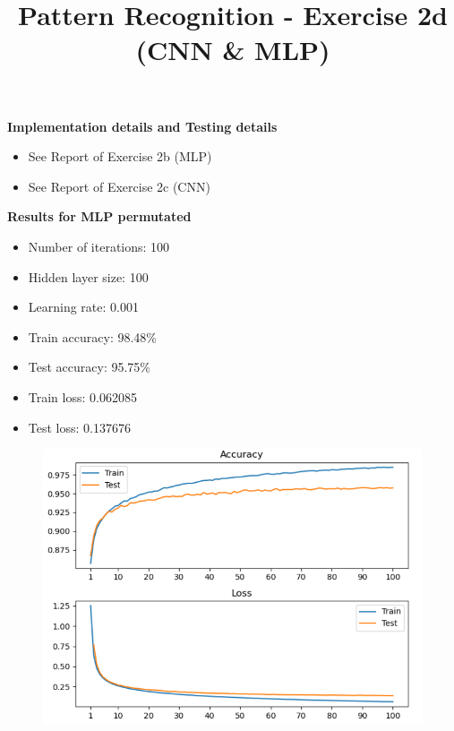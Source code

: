 \documentclass[10pt,a4paper,fullpage]{article}
\begin{document}
\title{Pattern Recognition - Exercise 2d (CNN \& MLP)}
\author{}
\predate{}
\postdate{}
\date{\vspace{-5ex}}
\maketitle


\textbf{Implementation details and Testing details}
\begin{itemize}
	\item See Report of Exercise 2b (MLP)
	\item See Report of Exercise 2c (CNN)
\end{itemize}
\hfill \break

\textbf{Results for MLP permutated}
\begin{itemize}
	\item Number of iterations: 100
    \item Hidden layer size: 100
    \item Learning rate: 0.001
    \item Train accuracy: 98.48\%
    \item Test accuracy: 95.75\%
    \item Train loss: 0.062085
    \item Test loss: 0.137676
\end{itemize}

\begin{figure}[H]
	\begin{center}
		\includegraphics[scale=0.6]{mlp_model_plot_permutated.png}
	\end{center}
\end{figure}
\end{document}
